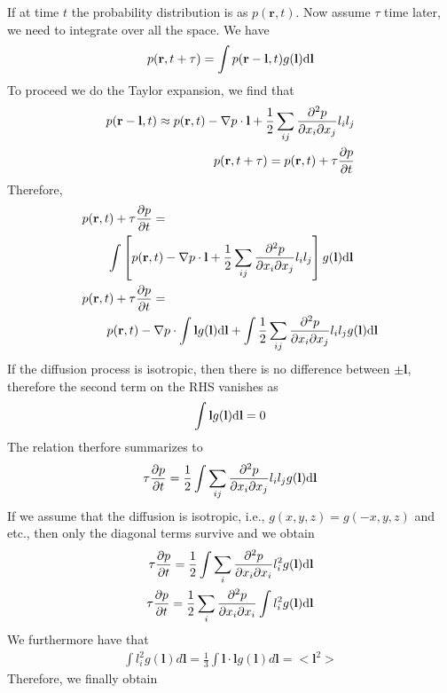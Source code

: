 If at time $t$ the probability distribution is as
$p(\mathbf{r},t)$. Now assume $\tau$ time later, we need to integrate
over all the space. We have
%
\begin{align}
  p(\mathbf{r},t + \tau ) = \int p(\mathbf{r}- \mathbf{l}, t) g(\mathbf{l}) \text{d} \mathbf{l} 
\end{align}
%
To proceed we do the Taylor expansion, we find that
%
\begin{align}
  p(\mathbf{r}-\mathbf{l},t) \approx p(\mathbf{r},t) - \nabla p \cdot \mathbf{l} + \frac{1}{2}  \sum_{ij} \frac{\partial^{2} p}{\partial x_i \partial x_j} l_i l_j \\
  p(\mathbf{r}, t+\tau) = p(\mathbf{r},t) + \tau \frac{\partial p }{\partial t} 
\end{align}
%
Therefore,
%
\begin{align}
  & p(\mathbf{r},t) + \tau \frac{\partial p }{\partial t}   = \nonumber \\
  & \qquad  \int \left[ p(\mathbf{r},t) - \nabla p \cdot \mathbf{l} + \frac{1}{2}  \sum_{ij} \frac{\partial^{2} p}{\partial x_i \partial x_j} l_i l_j \right] g(\mathbf{l}) \text{d} \mathbf{l} \\
   & p(\mathbf{r},t) + \tau \frac{\partial p }{\partial t}   = \nonumber \\
  & \qquad   p (\mathbf{r},t) - \nabla p \cdot \int \mathbf{l}  g(\mathbf{l}) \text{d} \mathbf{l} +  \int \frac{1}{2}  \sum_{ij} \frac{\partial^{2} p}{\partial x_i \partial x_j} l_i l_j g(\mathbf{l}) \text{d} \mathbf{l} 
\end{align}
%
If the diffusion process is isotropic, then there is no difference
between $\pm \mathbf{l}$, therefore the second term on the RHS
vanishes as
%
\begin{align}
  \int \mathbf{l} g(\mathbf{l}) \text{d} \mathbf{l} = 0  
\end{align}
%
The relation therfore summarizes to
%
\begin{align}
  \tau \frac{\partial p }{\partial t}  = \frac{1}{2} \int \sum_{ij} \frac{\partial^{2} p }{\partial x_i \partial x_j} l_il_j g(\mathbf{l}) \text{d} \mathbf{l} 
\end{align}
%
If we assume that the diffusion is isotropic, i.e., $g(x,y,z) =
g(-x,y,z)$ and etc., then only the diagonal terms survive and we obtain
%
\begin{align}
  \tau \frac{\partial p }{\partial t}  = \frac{1}{2} \int \sum_{i} \frac{\partial^{2} p }{\partial x_i \partial x_i} l_i^2 g(\mathbf{l}) \text{d} \mathbf{l} \\
    \tau \frac{\partial p }{\partial t}  = \frac{1}{2} \sum_{i} \frac{\partial^{2} p }{\partial x_i \partial x_i} \int  l_i^2 g(\mathbf{l}) \text{d} \mathbf{l} 
\end{align}
%
We furthermore have that
%
\begin{align}
  \int l_i^2 g(\mathbf{l}) d \mathbf{l} = \frac{1}{3} \int \mathbf{l}\cdot \mathbf{l} g(\mathbf{l}) d \mathbf{l} = < \mathbf{l}^2>
\end{align}
%
Therefore, we finally obtain
%

